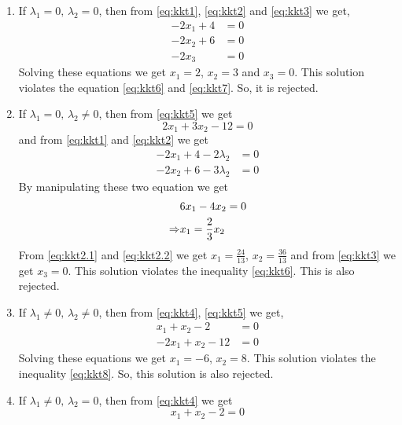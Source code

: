 \documentclass[../main-sheet.tex]{subfiles}
\begin{document}
\begin{soln}
        \begin{enumerate}[label=Case \arabic*:]
            \item If \(\lambda_1=0,\, \lambda_2=0\), then from \eqref{eq:kkt1}, \eqref{eq:kkt2} and \eqref{eq:kkt3} we get,
            \begin{align*}
                -2x_1+4&=0\\
                -2x_2+6&=0\\
                -2x_3&=0
            \end{align*}
            Solving these equations we get \(x_1=2\), \(x_2=3\) and \(x_3=0\). This solution violates the equation \eqref{eq:kkt6} and \eqref{eq:kkt7}. So, it is rejected.
            \item If \(\lambda_1=0,\, \lambda_2\neq 0\), then from \eqref{eq:kkt5} we get 
            \begin{equation}
                2x_1+3x_2-12=0 \label{eq:kkt2.1}
            \end{equation}
            and from \eqref{eq:kkt1} and \eqref{eq:kkt2} we get
            \begin{align*}
                -2x_1+4-2\lambda_2&=0\\
                -2x_2+6-3\lambda_2&=0
            \end{align*}
            By manipulating these two equation we get
            \begin{align}
                &6x_1-4x_2=0\notag\\
                \Rightarrow &x_1=\frac{2}{3}x_2\label{eq:kkt2.2}
            \end{align}
            From \eqref{eq:kkt2.1} and \eqref{eq:kkt2.2} we get \(x_1=\frac{24}{13}\), \(x_2=\frac{36}{13}\) and from \eqref{eq:kkt3} we get \(x_3=0\). This solution violates the inequality \eqref{eq:kkt6}. This is also rejected.
            \item If \(\lambda_1\neq 0,\, \lambda_2\neq 0\), then from \eqref{eq:kkt4}, \eqref{eq:kkt5} we get,
            \begin{align*}
                x_1+x_2-2&=0\\
                -2x_1+x_2-12&=0
            \end{align*}
            Solving these equations we get \(x_1=-6\), \(x_2=8\). This solution violates the inequality \eqref{eq:kkt8}. So, this solution is also rejected.
            \item  If \(\lambda_1\neq 0,\, \lambda_2= 0\), then from \eqref{eq:kkt4} we get 
            \[
                x_1+x_2-2=0
\]
\end{enumerate}
\end{soln}
\end{document}
